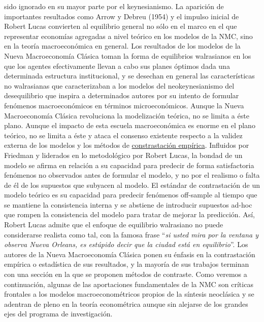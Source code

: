 \documentclass{nuevotema}
\begin{document}
sido ignorado en su mayor parte por el keynesianismo. La aparición de importantes resultados como Arrow y Debreu (1954) y el impulso inicial de Robert Lucas convierten al equilibrio general no sólo en el marco en el que representar economías agregadas a nivel teórico en los modelos de la NMC, sino en la teoría macroeconómica en general. Los resultados de los modelos de la Nueva Macroeconomía Clásica toman la forma de equilibrios walrasianos en los que los agentes efectivamente llevan a cabo sus planes óptimos dada una determinada estructura institucional, y se desechan en general las características no walrasianas que caracterizaban a los modelos del neokeynesianismo del desequilibrio que inspira a determinados autores por su intento de formular fenómenos macroeconómicos en términos microeconómicos. Aunque la Nueva Macroeconomía Clásica revoluciona la modelización teórica, no se limita a éste plano. Aunque el impacto de esta escuela macroeconómica es enorme en el plano teórico, no se limita a éste y ataca el consenso existente respecto a la validez externa de los modelos y los métodos de \underline{constrastación empírica}. Influidos por Friedman y liderados en lo metodológico por Robert Lucas, la bondad de un modelo se afirma en relación a su capacidad para predecir de forma satisfactoria fenómenos no observados antes de formular el modelo, y no por el realismo o falta de él de los supuestos que subyacen al modelo. El estándar de contrastación de un modelo teórico es su capacidad para predecir fenómenos off-sample al tiempo que se mantiene la consistencia interna y se abstiene de introducir supuestos ad-hoc que rompen la consistencia del modelo para tratar de mejorar la predicción. Así, Robert Lucas admite que el enfoque de equilibrio walrasiano no puede considerarse realista como tal, con la famosa frase ``\textit{si usted mira por la ventana y observa Nueva Orleans, es estúpido decir que la ciudad está en equilibrio}''. Los autores de la Nueva Macroeconomía Clásica ponen su énfasis en la contrastación empírica o estadística de sus resultados, y la mayoría de sus trabajos terminan con una sección en la que se proponen métodos de contraste. Como veremos a continuación, algunas de las aportaciones fundamentales de la NMC son críticas frontales a los modelos macroeconométricos propios de la síntesis neoclásica y se adentran de pleno en la teoría econométrica aunque sin alejarse de los grandes ejes del programa de investigación. 
\end{document}
